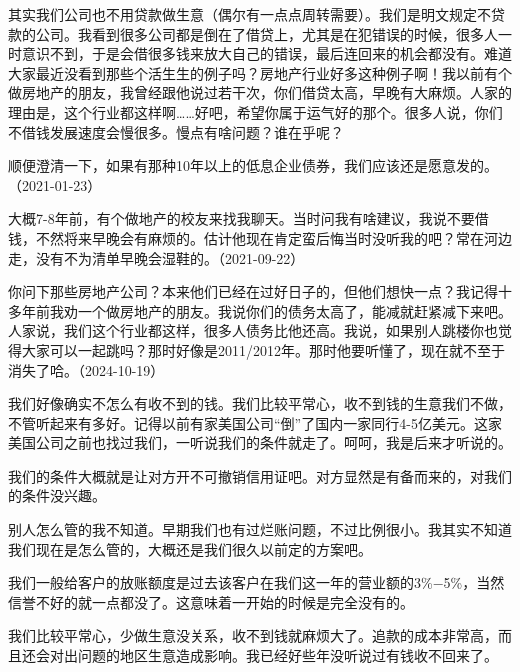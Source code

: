 
其实我们公司也不用贷款做生意（偶尔有一点点周转需要）。我们是明文规定不贷款的公司。我看到很多公司都是倒在了借贷上，尤其是在犯错误的时候，很多人一时意识不到，于是会借很多钱来放大自己的错误，最后连回来的机会都没有。难道大家最近没看到那些个活生生的例子吗？房地产行业好多这种例子啊！我以前有个做房地产的朋友，我曾经跟他说过若干次，你们借贷太高，早晚有大麻烦。人家的理由是，这个行业都这样啊……好吧，希望你属于运气好的那个。很多人说，你们不借钱发展速度会慢很多。慢点有啥问题？谁在乎呢？

顺便澄清一下，如果有那种10年以上的低息企业债券，我们应该还是愿意发的。（2021-01-23）

大概7-8年前，有个做地产的校友来找我聊天。当时问我有啥建议，我说不要借钱，不然将来早晚会有麻烦的。估计他现在肯定蛮后悔当时没听我的吧？常在河边走，没有不为清单早晚会湿鞋的。（2021-09-22）


你问下那些房地产公司？本来他们已经在过好日子的，但他们想快一点？我记得十多年前我劝一个做房地产的朋友。我说你们的债务太高了，能减就赶紧减下来吧。人家说，我们这个行业都这样，很多人债务比他还高。我说，如果别人跳楼你也觉得大家可以一起跳吗？那时好像是2011/2012年。那时他要听懂了，现在就不至于消失了哈。（2024-10-19）


我们好像确实不怎么有收不到的钱。我们比较平常心，收不到钱的生意我们不做，不管听起来有多好。记得以前有家美国公司“倒”了国内一家同行4-5亿美元。这家美国公司之前也找过我们，一听说我们的条件就走了。呵呵，我是后来才听说的。


我们的条件大概就是让对方开不可撤销信用证吧。对方显然是有备而来的，对我们的条件没兴趣。

别人怎么管的我不知道。早期我们也有过烂账问题，不过比例很小。我其实不知道我们现在是怎么管的，大概还是我们很久以前定的方案吧。

我们一般给客户的放账额度是过去该客户在我们这一年的营业额的3\%\( - \)5\%，当然信誉不好的就一点都没了。这意味着一开始的时候是完全没有的。

我们比较平常心，少做生意没关系，收不到钱就麻烦大了。追款的成本非常高，而且还会对出问题的地区生意造成影响。我已经好些年没听说过有钱收不回来了。


